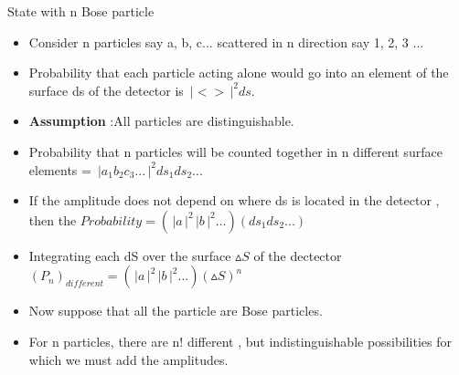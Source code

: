 \documentclass[aspectratio=169]{beamer}
\begin{document}
\begin{frame}{State with n Bose particle}
	\begin{itemize}
		\item Consider n particles say a, b, c... scattered in n direction say 1, 2, 3 ... \newline
		\item Probability that each particle acting alone would go into an element of the surface ds of the detector is $\,\Bigr\rvert < >\,\Bigr\rvert^{2} ds$. 
	\end{itemize}
\end{frame} 

\begin{frame}
	\begin{itemize}
		\item \textbf{Assumption} :All particles are distinguishable. \newline
		\item Probability that n particles will be counted together in n different surface elements = $\,\Bigr\rvert a_{1}b_{2}c_{3}... \,\Bigr\rvert^{2}ds_{1}ds_{2}...$ \newline
		\item If the amplitude does not depend on where ds is located in the detector , then the \newline
		$Probability = \left(\,\Bigr\rvert a \,\Bigr\rvert^{2}\,\Bigr\rvert b \,\Bigr\rvert^{2}...\right)(ds_{1}ds_{2}...)$
	\end{itemize}
\end{frame} 

\begin{frame}
	\begin{itemize}
		\item Integrating each dS over the surface $\vartriangle S$ of the dectector \newline 
		$(P_{n})_{different} = \left(\,\Bigr\rvert a \,\Bigr\rvert^{2}\,\Bigr\rvert b \,\Bigr\rvert^{2}...\right)(\vartriangle S)^{n}$ \newline
		\item Now suppose that all the particle are Bose particles.
		\item For n particles, there are n! different , but indistinguishable  possibilities for which we must add the amplitudes. \newline
	\end{itemize}
\end{frame}
\end{document}

